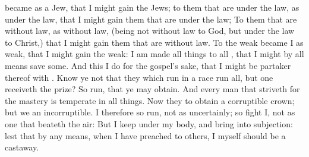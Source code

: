 {became
as a
Jew,
that I might
gain the
Jews; to them that
are
under the
law,
as
under the
law,
that I might
gain them that
are
under the
law;
To them that are without
law,
as without
law, (being
not without
law to
God,
but under the
law to
Christ,)
that I might
gain them that are without
law.
To the
weak became
I
as
weak,
that I might
gain the
weak: I am
made all
things to
all
{},
that I
might by all
means
save
some.
And
this I
do
for the
gospel’s sake,
that I might
be
partaker thereof
with
{}.
Know
ye
not
that they
which
run
in a
race
run
all,
but
one
receiveth the
prize?
So
run,
that ye may
obtain.
And every
man that striveth for the
mastery is
temperate in all
things.
Now
they
{}
to
obtain a
corruptible
crown;
but
we an
incorruptible.
I
therefore
so
run,
not
as
uncertainly;
so fight
I,
not
as one that
beateth the
air:
But I keep
under
my
body,
and
bring
{} into
subjection: lest that by any
means, when I have
preached to
others, I
myself should
be a
castaway.

}
